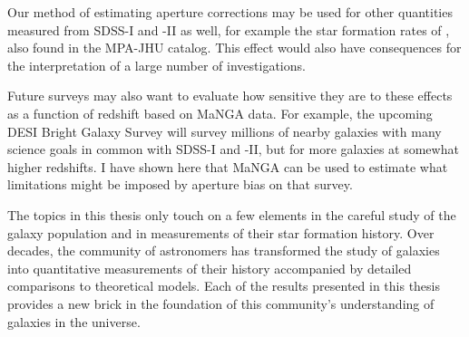Our method of estimating aperture corrections may be 
used for other quantities measured from SDSS-I and -II as
well, for example the star formation rates of \citet{brinchmann_physical_2004}, also found in the 
MPA-JHU catalog. This effect would also have
consequences for the interpretation of 
a large number of investigations.

Future surveys may also want to evaluate how sensitive 
they are to these effects as a function of redshift based
on MaNGA data. For example, the upcoming DESI Bright Galaxy
Survey \citep{desi16a} will survey millions of nearby
galaxies with many science goals in common with 
SDSS-I and -II, but for more galaxies at somewhat
higher redshifts. I have shown here that MaNGA can be used
to estimate what limitations might be imposed by aperture bias 
on that survey. 

The topics in this thesis only touch on a few elements in 
the careful study of the galaxy population and in measurements
of their star formation history. 
Over decades, the community of astronomers has transformed
the study of galaxies into quantitative measurements
of their history accompanied by detailed comparisons to
theoretical models. Each of the results presented in this
thesis provides a new brick in the foundation of this 
community's understanding of galaxies in the universe.

